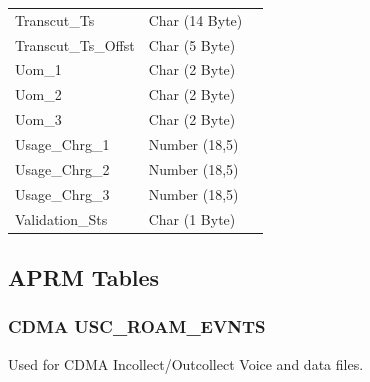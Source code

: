 \documentclass[12pt,twoside]{article}
\begin{document}
\begin{longtable}{l|l|l}
Transcut\_Ts & Char (14 Byte) & \\
Transcut\_Ts\_Offst & Char (5 Byte) & \\
Uom\_1 & Char (2 Byte) & \\
Uom\_2 & Char (2 Byte) & \\
Uom\_3 & Char (2 Byte) & \\
Usage\_Chrg\_1 & Number (18,5) & \\
Usage\_Chrg\_2 & Number (18,5) & \\
Usage\_Chrg\_3 & Number (18,5) & \\
Validation\_Sts & Char (1 Byte) & \\
\hline
\end{longtable}

\normalsize
\subsection{APRM Tables}
\label{sec:orgheadline141}
\subsubsection{CDMA USC\_ROAM\_EVNTS}
\label{sec:orgheadline136}
Used for CDMA Incollect/Outcollect Voice and data files.
\footnotesize
\end{document}
